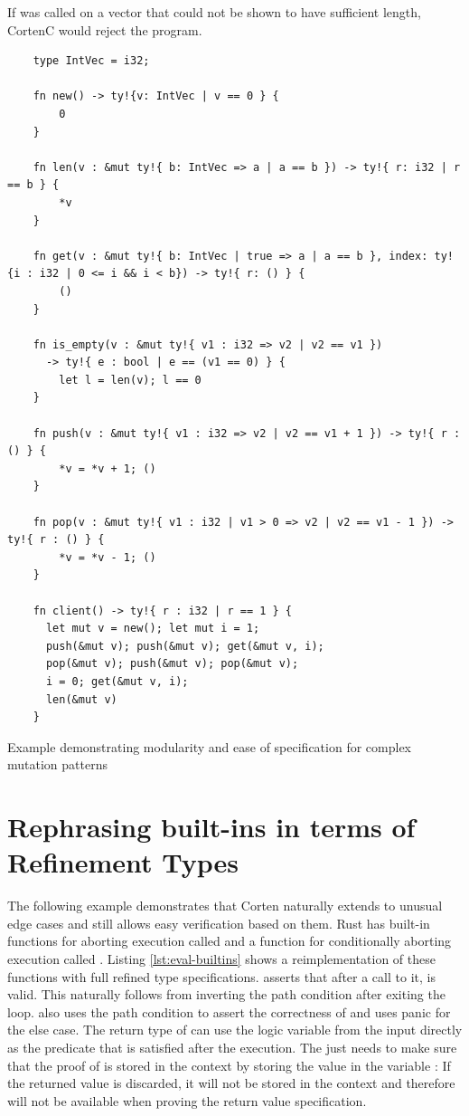 \documentclass[twoside, english]{sdqthesis}
\theoremstyle{definition}
\begin{document}
If  was called on a vector that could not be shown to have sufficient length, CortenC would reject the program.

\begin{listing}[ht]
  \begin{verbatim}
    type IntVec = i32;

    fn new() -> ty!{v: IntVec | v == 0 } {
        0
    }

    fn len(v : &mut ty!{ b: IntVec => a | a == b }) -> ty!{ r: i32 | r == b } {
        *v
    }

    fn get(v : &mut ty!{ b: IntVec | true => a | a == b }, index: ty!{i : i32 | 0 <= i && i < b}) -> ty!{ r: () } {
        ()
    }

    fn is_empty(v : &mut ty!{ v1 : i32 => v2 | v2 == v1 }) 
      -> ty!{ e : bool | e == (v1 == 0) } {
        let l = len(v); l == 0
    }

    fn push(v : &mut ty!{ v1 : i32 => v2 | v2 == v1 + 1 }) -> ty!{ r : () } {
        *v = *v + 1; ()
    }

    fn pop(v : &mut ty!{ v1 : i32 | v1 > 0 => v2 | v2 == v1 - 1 }) -> ty!{ r : () } {
        *v = *v - 1; ()
    }

    fn client() -> ty!{ r : i32 | r == 1 } {
      let mut v = new(); let mut i = 1;
      push(&mut v); push(&mut v); get(&mut v, i);
      pop(&mut v); push(&mut v); pop(&mut v);
      i = 0; get(&mut v, i);
      len(&mut v)
    }
  \end{verbatim}
  \caption{Example demonstrating modularity and ease of specification for complex mutation patterns}
  \label{lst:evaluation-vec}
\end{listing}


\section{Rephrasing built-ins in terms of Refinement Types}

The following example demonstrates that Corten naturally extends to unusual edge cases and still allows easy verification based on them.
Rust has built-in functions for aborting execution \- called  \- and a function for conditionally aborting execution \- called . Listing \ref{lst:eval-builtins} shows a reimplementation of these functions with full refined type specifications. 
 asserts that after a call to it,  is valid. This naturally follows from inverting the path condition after exiting the loop. 
 also uses the path condition to assert the correctness of  and uses panic for the else case. The return type of  can use the logic variable  from the input directly as the predicate that is satisfied after the execution.
The  just needs to make sure that the proof of  is stored in the context by storing the value in the variable : If the returned value is discarded, it will not be stored in the context and therefore will not be available when proving the return value specification.
\end{document}

